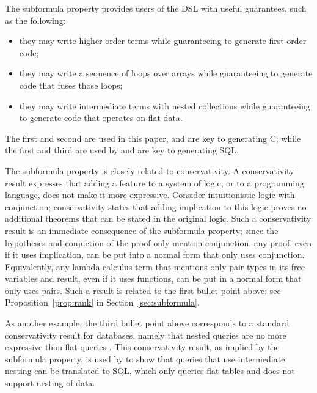 \documentclass[authoryear,9pt]{sigplanconf}
\begin{document}
The subformula property provides users of the
DSL with useful guarantees, such as the following:
\begin{itemize}

\item they may write higher-order terms
while guaranteeing to generate first-order code;

\item they may write a sequence of loops over arrays
while guaranteeing to generate code that fuses those loops;

\item they may write intermediate terms with nested collections
while guaranteeing to generate code that operates on flat data.

\end{itemize}
The first and second are used in this paper, and are key
to generating C; while the
first and third are used by \citet{cheney:linq}
and are key to generating SQL.

The subformula property is closely related to conservativity.  A
conservativity result expresses that adding a feature to a system of
logic, or to a programming language, does not make it more expressive.
Consider intuitionistic logic with conjunction; conservativity states
that adding implication to this logic proves no additional theorems
that can be stated in the original logic.
Such a conservativity result
is an immediate consequence of the subformula property; since the
hypotheses and conjuction of the proof only mention conjunction, any
proof, even if it uses implication, can be put into a normal form that
only uses conjunction. Equivalently, any lambda calculus term that
mentions only pair types in its free variables and result, even if it
uses functions, can be put in a normal form that only uses pairs. Such
a result is related to the first bullet point above; see
Proposition~\ref{prop:rank} in Section~\ref{sec:subformula}.

As another example, the third bullet point above corresponds to a
standard conservativity result for databases, namely that nested
queries are no more expressive than flat queries \citep{Wong-1993,Wong-1996}.
This conservativity result, as implied by the subformula property, is
used by \citet{cheney:linq} to show that queries that use intermediate
nesting can be translated to SQL, which only queries flat tables and
does not support nesting of data.
\end{document}
